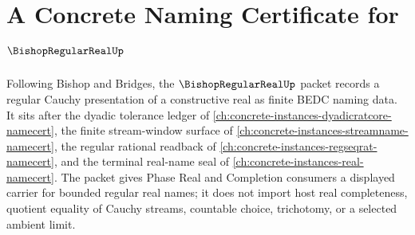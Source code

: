 \chapter{A Concrete Naming Certificate for $\BishopRegularRealUp$}
\label{ch:concrete-instances-bishop-regular-real-namecert}

Following Bishop and Bridges, the $\BishopRegularRealUp$ packet records a regular Cauchy presentation of a constructive real as finite BEDC naming data. It sits after the dyadic tolerance ledger of \autoref{ch:concrete-instances-dyadicratcore-namecert}, the finite stream-window surface of \autoref{ch:concrete-instances-streamname-namecert}, the regular rational readback of \autoref{ch:concrete-instances-regseqrat-namecert}, and the terminal real-name seal of \autoref{ch:concrete-instances-real-namecert}. The packet gives Phase Real and Completion consumers a displayed carrier for bounded regular real names; it does not import host real completeness, quotient equality of Cauchy streams, countable choice, trichotomy, or a selected ambient limit.

